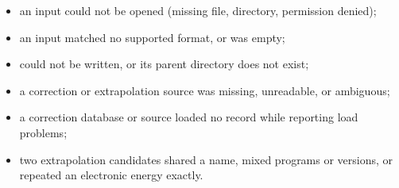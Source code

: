 \begin{itemize}
  \item an input could not be opened (missing file, directory, permission
        denied);
  \item an input matched no supported format, or was empty;
  \item {} could not be written, or its parent directory does not
        exist;
  \item a correction or extrapolation source was missing, unreadable, or
        ambiguous;
  \item a correction database or source loaded no record while reporting
        load problems;
  \item two extrapolation candidates shared a name, mixed programs or
        versions, or repeated an electronic energy exactly.
\end{itemize}
